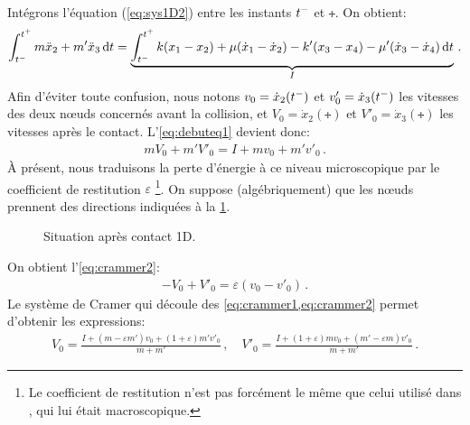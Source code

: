 \noindent Intégrons l'équation (\ref{eq:sys1D2}) entre les instants $t^{-}$ et $\tplus$. On obtient:
\begin{align}    \label{eq:debuteq1}
    \int_{\tmoins}^{\tplus} m\ddot x_2 + m'\ddot x_3 \diff t = \underbrace{\int_{\tmoins}^{\tplus} k(x_1 - x_2) + \mu (\dot x_1 - \dot x_2) - k'(x_3 - x_4) - \mu'(\dot x_3 - \dot x_4) \diff t}_{I} \,.
\end{align}
Afin d'éviter toute confusion, nous notons $v_0 = \dot{x}_2(t^{-})$ et $v'_0 = \dot{x}_3(t^{-})$ les vitesses des deux n\oe{}uds concernés avant la collision, et $V_0 = \dot{x}_2(\tplus)$ et $V'_0 = \dot{x}_3(\tplus)$ les vitesses après le contact. L'\cref{eq:debuteq1} devient donc:
\begin{align} \label{eq:crammer1}
    mV_0 + m'V'_0 = I + mv_0 + m'v'_0 \,.
\end{align}
À présent, nous traduisons la perte d'énergie à ce niveau microscopique par le coefficient de restitution $\varepsilon$ \footnote{Le coefficient de restitution n'est pas forcément le même que celui utilisé dans \parencite{rabatel2015thesis}, qui lui était macroscopique.}. On suppose (algébriquement) que les n\oe{}uds prennent des directions indiquées à la \cref{fig:contact1dapres}. 
\begin{figure}[!h]
    \centering
    \caption{Situation après contact 1D.}
    \label{fig:contact1dapres}
\end{figure}

\noindent On obtient l'\cref{eq:crammer2}:
\begin{align} \label{eq:crammer2}
    - V_0 + V'_0 = \varepsilon (v_0 - v'_0) \,.
\end{align}
Le système de Cramer qui découle des \cref{eq:crammer1,eq:crammer2} permet d'obtenir les expressions:
\begin{align} \label{eq:vitessesapres1D}
    V_0 = \frac{I + (m-\varepsilon m')v_0 + (1+\varepsilon)m'v'_0}{m+m'} \,, \quad V'_0 = \frac{I + (1+\varepsilon)mv_0 + (m'-\varepsilon m)v'_0}{m+m'}\,.
\end{align}


